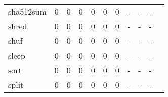 \begin{longtable}{lp{1.2cm}p{1.2cm}p{1.2cm}p{1.2cm}p{1.2cm}p{1.2cm}p{1.2cm}p{1.2cm}p{1.2cm}p{1.2cm}}
sha512sum &                                     0 &                                                  0 &                                                  0 &                                                  0 &                                                  0 &                                                  0 &                                             - &                                                  - &                                                  - \\
shred     &                                     0 &                                                  0 &                                                  0 &                                                  0 &                                                  0 &                                                  0 &                                             - &                                                  - &                                                  - \\
shuf      &                                     0 &                                                  0 &                                                  0 &                                                  0 &                                                  0 &                                                  0 &                                             - &                                                  - &                                                  - \\
sleep     &                                     0 &                                                  0 &                                                  0 &                                                  0 &                                                  0 &                                                  0 &                                             - &                                                  - &                                                  - \\
sort      &                                     0 &                                                  0 &                                                  0 &                                                  0 &                                                  0 &                                                  0 &                                             - &                                                  - &                                                  - \\
split     &                                     0 &                                                  0 &                                                  0 &                                                  0 &                                                  0 &                                                  0 &                                             - &                                                  - &                                                  - \\

\end{longtable}
